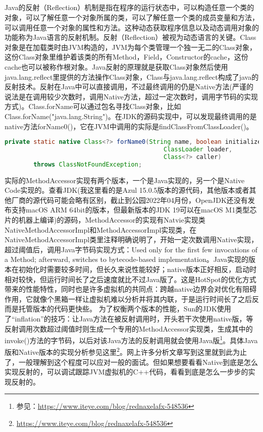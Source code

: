 \documentclass[../../../interview-questions.tex]{subfiles}
\begin{document}
\subsection{\color{red}{Java反射的实现原理}}

Java的反射（Reflection）机制是指在程序的运行状态中，可以构造任意一个类的对象，可以了解任意一个对象所属的类，可以了解任意一个类的成员变量和方法，可以调用任意一个对象的属性和方法。这种动态获取程序信息以及动态调用对象的功能称为Java语言的反射机制。反射（Reflection）被视为动态语言的关键。Class对象是在加载类时由JVM构造的，JVM为每个类管理一个独一无二的Class对象，这份Class对象里维护着该类的所有Method，Field，Constructor的cache，这份cache也可以被称作根对象。Java反射的原理就是获取Class对象然后使用java.lang.reflect里提供的方法操作Class对象，Class与java.lang.reflect构成了java的反射技术。反射在Java中可以直接调用，不过最终调用的仍是Native方法(严谨的说法是在调用较少次数时，调用Native方法，超过一定次数时，调用字节码的实现方式)。Class.forName可以通过包名寻找Class对象，比如Class.forName("java.lang.String")。在JDK的源码实现中，可以发现最终调用的是native方法forName0()，它在JVM中调用的实际是findClassFromClassLoader()。

\begin{lstlisting}[language=Java]
private static native Class<?> forName0(String name, boolean initialize,
                                            ClassLoader loader,
                                            Class<?> caller)
        throws ClassNotFoundException;
\end{lstlisting}

实际的MethodAccessor实现有两个版本，一个是Java实现的，另一个是Native Code实现的。查看JDK(我这里看的是Azul 15.0.5版本的源代码，其他版本或者其他厂商的源代码可能会略有区别，截止到公园2022年04月份，OpenJDK还没有发布支持macOS ARM 64bit的版本，但最新版本的JDK 19可以在macOS M1类型芯片的机器上编译)的源码，MethodAccessor的实现有Natvie实现类NativeMethodAccessorImpl和MethodAccessorImpl实现类，在NativeMethodAccessorImpl类里注释明确说明了，开始一定次数调用Native实现，超过阈值后，调用Java字节码实现方式：Used only for the first few invocations of a Method; afterward, switches to bytecode-based implementation。Java实现的版本在初始化时需要较多时间，但长久来说性能较好；native版本正好相反，启动时相对较快，但运行时间长了之后速度就比不过Java版了。这是HotSpot的优化方式带来的性能特性，同时也是许多虚拟机的共同点：跨越native边界会对优化有阻碍作用，它就像个黑箱一样让虚拟机难以分析并将其内联，于是运行时间长了之后反而是托管版本的代码更快些。
为了权衡两个版本的性能，Sun的JDK使用了“inflation”的技巧：让Java方法在被反射调用时，开头若干次使用native版，等反射调用次数超过阈值时则生成一个专用的MethodAccessor实现类，生成其中的invoke()方法的字节码，以后对该Java方法的反射调用就会使用Java版\footnote{参见：\url{https://www.iteye.com/blog/rednaxelafx-548536}}。具体Java版和Native版本的实现分析参见这里\footnote{\url{https://www.iteye.com/blog/rednaxelafx-548536}}。网上许多分析文章写到这里就到此为止了，一般理解到这个程度可以应对一般的面试。但如果想要看看Native到底是怎么实现反射的，可以调试跟踪JVM虚拟机的C++代码，看看到底是怎么一步步的实现反射的。
\end{document}
